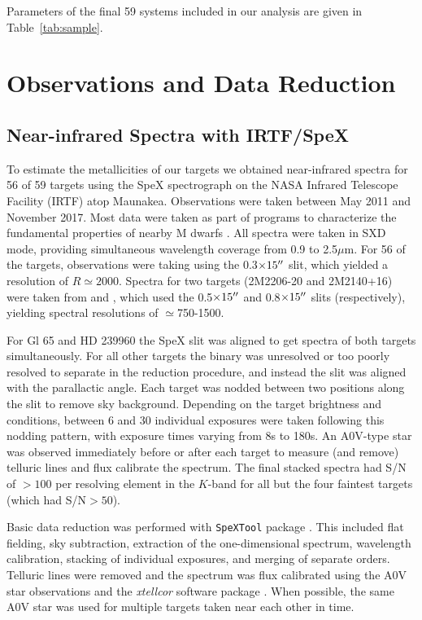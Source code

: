 \documentclass[twocolumn]{aastex62}
\begin{document}
Parameters of the final 59 systems included in our analysis are given in Table~\ref{tab:sample}.

\section{Observations and Data Reduction}\label{sec:obs} 

\subsection{Near-infrared Spectra with IRTF/SpeX}

To estimate the metallicities of our targets we obtained near-infrared spectra for 56 of 59 targets using the SpeX spectrograph \citep{Rayner2003} on the NASA Infrared Telescope Facility (IRTF) atop Maunakea. Observations were taken between May 2011 and November 2017. Most data were taken as part of programs to characterize the fundamental properties of nearby M dwarfs \citep[e.g.,][]{Mann2013c,Gaidos2014,Terrien2015}. All spectra were taken in SXD mode, providing simultaneous wavelength coverage from 0.9 to 2.5$\mu$m. For 56 of the targets, observations were taking using the 0.3$\times15\mbox{$^{\prime\prime}$}$ slit, which yielded a resolution of $R\simeq2000$. Spectra for two targets (2M2206-20 and 2M2140+16) were taken from \citet{2009ApJ...706..328D} and \citet{Dupuy2012}, which used the 0.5$\times15\mbox{$^{\prime\prime}$}$ and 0.8$\times15\mbox{$^{\prime\prime}$}$ slits (respectively), yielding spectral resolutions of $\simeq$750-1500. 

For Gl 65 and HD 239960 the SpeX slit was aligned to get spectra of both targets simultaneously. For all other targets the binary was unresolved or too poorly resolved to separate in the reduction procedure, and instead the slit was aligned with the parallactic angle. Each target was nodded between two positions along the slit to remove  sky background. Depending on the target brightness and conditions, between 6 and 30 individual exposures were taken following this nodding pattern, with exposure times varying from 8s to 180s. An A0V-type star was observed immediately before or after each target to measure (and remove) telluric lines and flux calibrate the spectrum. The final stacked spectra had S/N of $>100$ per resolving element in the $K$-band for all but the four faintest targets (which had S/N$>50$). 

Basic data reduction was performed with {\tt SpeXTool} package \citep{Cushing2004}. This included flat fielding, sky subtraction, extraction of the one-dimensional spectrum, wavelength calibration, stacking of individual exposures, and merging of separate orders. Telluric lines were removed and the spectrum was flux calibrated using the A0V star observations and the \textit{xtellcor} software package \citep{Vacca2003}. When possible, the same A0V star was used for multiple targets taken near each other in time. 
\end{document}
